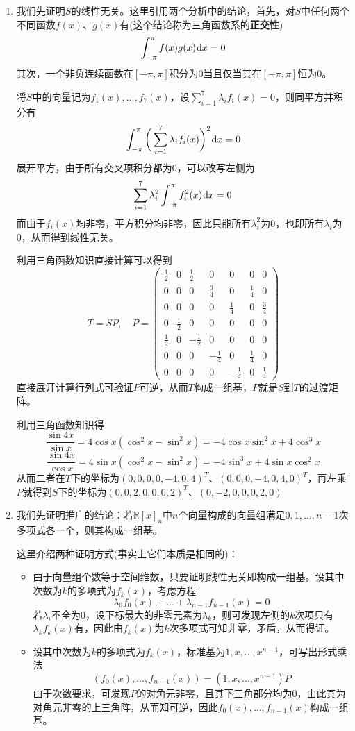 \documentclass[a4paper,UTF8,fontset=windows,AutoFakeBold]{ctexart}
\newcommand*{\dr}{\hspace{0.07em}\mathrm{d}}
\begin{document}
\begin{enumerate}
    \item
    我们先证明$S$的线性无关。这里引用两个分析中的结论，首先，对$S$中任何两个不同函数$f(x)$、$g(x)$有(这个结论称为三角函数系的\textbf{正交性})
    $$\int_{-\pi}^\pi f(x)g(x)\dr x=0$$
    其次，一个非负连续函数在$[-\pi,\pi]$积分为0当且仅当其在$[-\pi,\pi]$恒为0。

    将$S$中的向量记为$f_1(x),\dots,f_7(x)$，设$\sum_{i=1}^7\lambda_if_i(x)=0$，则同平方并积分有
    $$\int_{-\pi}^\pi\bigg(\sum_{i=1}^7\lambda_if_i(x)\bigg)^2\dr x=0$$
    展开平方，由于所有交叉项积分都为0，可以改写左侧为
    $$\sum_{i=1}^7\lambda_i^2\int_{-\pi}^\pi f_i^2(x)\dr x=0$$
    而由于$f_i(x)$均非零，平方积分均非零，因此只能所有$\lambda_i^2$为0，也即所有$\lambda_i$为0，从而得到线性无关。

    利用三角函数知识直接计算可以得到
    $$T=SP,\quad P=\begin{pmatrix}\frac{1}{2}&0&\frac{1}{2}&0&0&0&0\\0&0&0&\frac{3}{4}&0&\frac{1}{4}&0\\0&0&0&0&\frac{1}{4}&0&\frac{3}{4}\\0&\frac{1}{2}&0&0&0&0&0\\\frac{1}{2}&0&-\frac{1}{2}&0&0&0&0\\0&0&0&-\frac{1}{4}&0&\frac{1}{4}&0\\0&0&0&0&-\frac{1}{4}&0&\frac{1}{4}\end{pmatrix}$$
    直接展开计算行列式可验证$P$可逆，从而$T$构成一组基，$P$就是$S$到$T$的过渡矩阵。

    利用三角函数知识得
    $$\frac{\sin4x}{\sin x}=4\cos x(\cos^2x-\sin^2x)=-4\cos x\sin^2x+4\cos^3x$$
    $$\frac{\sin4x}{\cos x}=4\sin x(\cos^2x-\sin^2x)=-4\sin^3x+4\sin x\cos^2x$$
    从而二者在$T$下的坐标为$(0,0,0,0,-4,0,4)^T$、$(0,0,0,-4,0,4,0)^T$，再左乘$P$就得到$S$下的坐标为$(0,0,2,0,0,0,2)^T$、$(0,-2,0,0,0,2,0)$


    \item 
    我们先证明推广的结论：若$\mathbb{R}[x]_n$中$n$个向量构成的向量组满足$0,1,\dots,n-1$次多项式各一个，则其构成一组基。

    这里介绍两种证明方式(事实上它们本质是相同的)：
    \begin{itemize}
        \item 由于向量组个数等于空间维数，只要证明线性无关即构成一组基。设其中次数为$k$的多项式为$f_k(x)$，考虑方程
        $$\lambda_0f_0(x)+\dots+\lambda_{n-1}f_{n-1}(x)=0$$
        若$\lambda_i$不全为0，设下标最大的非零元素为$\lambda_k$，则可发现左侧的$k$次项只有$\lambda_kf_k(x)$有，因此由$f_k(x)$为$k$次多项式可知非零，矛盾，从而得证。
        \item 设其中次数为$k$的多项式为$f_k(x)$，标准基为$1,x,\dots,x^{n-1}$，可写出形式乘法
        $$(f_0(x),\dots,f_{n-1}(x))=(1,x,\dots,x^{n-1})P$$
        由于次数要求，可发现$P$的对角元非零，且其下三角部分均为0，由此其为对角元非零的上三角阵，从而知可逆，因此$f_0(x),\dots,f_{n-1}(x)$构成一组基。
    \end{itemize}


\end{enumerate}
\end{document}
